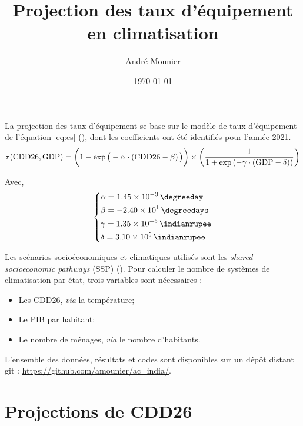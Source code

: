 \documentclass{article}
\date{\today}
\title{Projection des taux d'équipement en climatisation}
\author{\href{mailto:andre.mounier@ens-paris-saclay.fr}{André Mounier}}
\begin{document}
{\huge \noindent \thetitle}

\vspace{3mm}
{\Large \noindent \theauthor}


\vspace{1cm}

La projection des taux d'équipement se base sur le modèle de taux d'équipement de l'équation \eqref{eq:es} (\cite{mcneil_future_2008,isaac_modeling_2009,akpinar-ferrand_modeling_2010}), dont les coefficients ont été identifiés pour l'année 2021. 
\begin{equation}
   \label{eq:es}
   \tau(\mathrm{CDD26},\mathrm{GDP}) = \left(\vphantom{\frac{1}{1}}1- \exp{\big(-\alpha\cdot \left(\mathrm{CDD26}-\beta\right)\big)}\right) \times \left(\frac{1}{1+\exp\left(-\gamma\cdot \left(\mathrm{GDP}-\delta\right)\right)}\right)
\end{equation}

\noindent
Avec,
\begin{equation*}
   \begin{dcases}
      \alpha = \SI{1.45e-3}{\per\degreeday}\\
      \beta = \SI{-2.40e1}{\degreedays}\\
      \gamma = \text{\SI{1.35e-5}{\per\indianrupee}}\\
      \delta = \text{\SI{3.10e5}{\indianrupee}}\\
   \end{dcases}
\end{equation*}

Les scénarios socioéconomiques et climatiques utilisés sont les \textit{shared socioeconomic pathways} (SSP) (\cite{van_vuuren_shared_2017}). Pour calculer le nombre de systèmes de climatisation par état, trois variables sont nécessaires : 
\begin{itemize}
   \item Les CDD26, \textit{via} la température;
   \item Le PIB par habitant;
   \item Le nombre de ménages, \textit{via} le nombre d'habitants.\\
\end{itemize}

L'ensemble des données, résultats et codes sont disponibles sur un dépôt distant git : \url{https://github.com/amounier/ac_india/}.

\section{Projections de CDD26}
\end{document}
